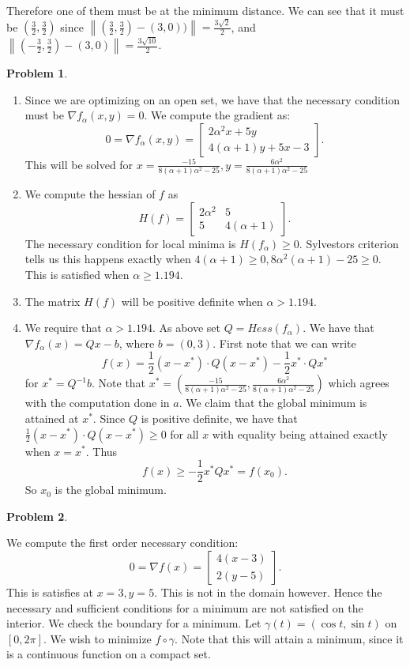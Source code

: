 \documentclass[12pt, a4paper]{article}
\newtheorem{problem}{Problem}
\theoremstyle{definition}
\newcommand{\penum}{ \begin{enumerate}[label=\bf(\alph*), leftmargin=0pt]}
\newcommand{\epenum}{ \end{enumerate} }
\newcommand{\grad}{\nabla}
\newcommand{\norm}[1]{\left\lVert#1\right\rVert}
\newcommand{\bmat}[1]{\begin{bmatrix}#1\end{bmatrix}}
\begin{document}
Therefore one of them must be at the minimum distance. We can see that it must be $(\frac{3}{2}, \frac{3}{2})$ since $\norm{(\frac{3}{2}, \frac{3}{2} )- (3,0))} = \frac{3\sqrt{2}}{2}$, and $\norm{(-\frac{3}{2}, \frac{3}{2}) - (3,0)} = \frac{3\sqrt{10}}{2}$. 
\newpage
\begin{problem}
\end{problem}
\penum 
\item Since we are optimizing on an open set, we have that the necessary condition must be $\grad f_\alpha(x,y) = 0$. We compute the gradient as: 
$$0 = \grad f_\alpha (x,y) = \bmat{2\alpha^2 x + 5y \\ 4(\alpha+1) y +5x -3}.$$
This will be solved for $x= \frac{-15}{8(\alpha+1)\alpha^2 -  25}, y= \frac{6\alpha^2}{8(\alpha+1)\alpha^2 - 25}$
\item We compute the hessian of $f$ as 
$$H(f) = \bmat{2\alpha^2 & 5 \\ 5 & 4(\alpha +1)}.$$
The necessary condition for local minima is $H(f_\alpha)\geq 0$. Sylvestors criterion tells us this happens exactly when $4(\alpha+1)\geq 0, 8\alpha^2(\alpha+1) - 25 \geq0$. This is satisfied when $\alpha \geq 1.194$. 
\item The matrix $H(f)$ will be positive definite when $\alpha> 1.194$. 
\item We require that $\alpha > 1.194$. As above set $Q = Hess(f_\alpha)$. We have that $\grad f_\alpha(x)  = Qx - b$, where $ b = (0,3)$. First note that we can write $$f(x) = \frac{1}{2} (x- x^\ast) \cdot Q (x-x^\ast) - \frac{1}{2} x^\ast \cdot Q x^\ast$$
for $x^\ast = Q^{-1}b$. Note that $x^\ast =( \frac{-15}{8(\alpha+1)\alpha^2 -  25},  \frac{6\alpha^2}{8(\alpha+1)\alpha^2 - 25} )$ which agrees with the computation done in $a$. We claim that the global minimum is attained at $x^\ast$. Since $Q$ is positive definite, we have that $\frac{1}{2} (x- x^\ast) \cdot Q (x-x^\ast) \geq 0$ for all $x$ with equality being attained exactly when $x = x^\ast$. Thus $$f(x) \geq - \frac{1}{2} x^\ast Q x^\ast = f(x_0). $$ So $x_0$ is the global minimum.
\epenum
\newpage
\begin{problem}
\end{problem}
We compute the first order necessary condition: 
$$0= \grad f(x) = \bmat{4(x-3) \\ 2(y-5)}.$$
This is satisfies at $x = 3,y=5$. This is not in the domain however. Hence the necessary and sufficient conditions for a minimum are not satisfied on the interior. We check the boundary for a minimum. Let $\gamma(t) = (\cos t, \sin t)$ on $[0,2\pi]$. We wish to minimize $f\circ \gamma$. Note that this will attain a minimum, since it is a continuous function on a compact set. 
\end{document}
